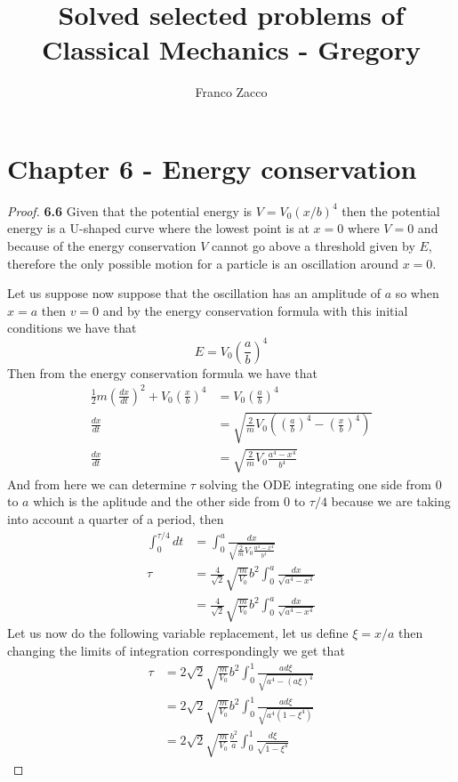 \documentclass[11pt]{article}
\title{\textbf{Solved selected problems of Classical Mechanics - Gregory}}
\author{Franco Zacco}
\date{}
\theoremstyle{definition}
\begin{document}
\maketitle
\thispagestyle{empty}

\section*{Chapter 6 - Energy conservation}

	\begin{proof}{\textbf{6.6}}
        Given that the potential energy is $V = V_0(x/b)^4$ then the potential energy is
        a U-shaped curve where the lowest point is at $x=0$ where $V=0$ and because of
        the energy conservation $V$ cannot go above a threshold given by $E$, therefore
        the only possible motion for a particle is an oscillation around $x=0$.

        Let us suppose now suppose that the oscillation has an amplitude of $a$ so when
        $x=a$ then $v=0$ and by the energy conservation formula with this initial
        conditions  we have that
        $$E = V_0 (\frac{a}{b})^4$$
        Then from the energy conservation formula we have that
        \begin{align*}
            \frac{1}{2}m(\frac{dx}{dt})^2 +V_0(\frac{x}{b})^4 &= V_0 (\frac{a}{b})^4 \\
            \frac{dx}{dt} &= \sqrt{\frac{2}{m}V_0((\frac{a}{b})^4 - (\frac{x}{b})^4)}\\
            \frac{dx}{dt} &= \sqrt{\frac{2}{m}V_0\frac{a^4-x^4}{b^4}}
        \end{align*}
        And from here we can determine $\tau$ solving the ODE integrating one side from
        0 to $a$ which is the aplitude and the other side from 0 to $\tau/4$ because
        we are taking into account a quarter of a period, then
        \begin{align*}
            \int_0^{\tau/4} dt &= \int_{0}^{a} \frac{dx}{\sqrt{\frac{2}{m}V_0\frac{a^4-x^4}{b^4}}}\\
            \tau &= \frac{4}{\sqrt{2}}\sqrt{\frac{m}{V_0}}b^2
                    \int_{0}^{a} \frac{dx}{\sqrt{a^4-x^4}}\\
                &= \frac{4}{\sqrt{2}}\sqrt{\frac{m}{V_0}}b^2
                \int_{0}^{a} \frac{dx}{\sqrt{a^4-x^4}}
        \end{align*}
        Let us now do the following variable replacement, let us define $\xi = x/a$
        then changing the limits of integration correspondingly we get that 
        \begin{align*}
            \tau &= 2\sqrt{2}\sqrt{\frac{m}{V_0}}b^2
                \int_{0}^{1} \frac{ad\xi}{\sqrt{a^4-(a\xi)^4}}\\
                &= 2\sqrt{2}\sqrt{\frac{m}{V_0}}b^2
                \int_{0}^{1} \frac{ad\xi}{\sqrt{a^4(1-\xi^4)}}\\
                &= 2\sqrt{2}\sqrt{\frac{m}{V_0}}\frac{b^2}{a}
                \int_{0}^{1} \frac{d\xi}{\sqrt{1-\xi^4}}
        \end{align*}
    \end{proof}
\end{document}
